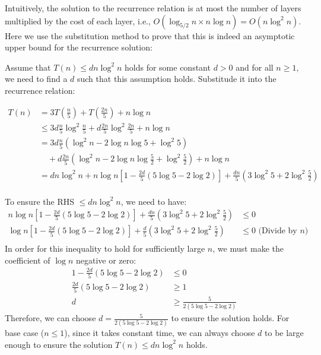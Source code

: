 \documentclass[11pt, a4paper, oneside]{memoir}
\begin{document}
Intuitively, the solution to the recurrence relation is at most the number of layers multiplied by the cost of each layer,
i.e., $O(\log_{5/2} n \times n \log n) = O(n \log^2 n)$. Here we use the substitution method to prove that this is indeed an asymptotic upper bound for the recurrence solution:

Assume that $T(n) \leq dn \log^2 n$ holds for some constant $d > 0$ and for all $n \geq 1$, we need to find a $d$ such that this assumption holds.
Substitude it into the recurrence relation:

\begin{align*}
    T(n) & = 3T(\frac{n}{5}) + T(\frac{2n}{5}) +  n \log n                                                              \\
         & \leq 3d\frac{n}{5} \log^2 \frac{n}{5} + d\frac{2n}{5} \log^2 \frac{2n}{5} + n \log n                         \\
         & =3d\frac{n}{5} (\log^2 n - 2 \log n \log 5 + \log^2 5)                                                       \\
         & \quad+d\frac{2n}{5} (\log^2 n - 2 \log n \log \frac{5}{2} + \log^2 \frac{5}{2}) + n \log n                   \\
         & = dn \log^2 n + n \log n [1-\frac{2d}{5}(5\log 5 - 2\log 2)] + \frac{dn}{5}(3\log^2 5 + 2\log^2 \frac{5}{2}) \\
\end{align*}

To ensure the RHS $\leq dn \log^2 n$, we need to have:
\begin{align*}
    n \log n [1-\frac{2d}{5}(5\log 5 - 2\log 2)] + \frac{dn}{5}(3\log^2 5 + 2\log^2 \frac{5}{2}) & \leq 0                         \\
    \log n [1-\frac{2d}{5}(5\log 5 - 2\log 2)] + \frac{d}{5}(3\log^2 5 + 2\log^2 \frac{5}{2})    & \leq 0 \text{ (Divide by $n$)} \\
\end{align*}
In order for this inequality to hold for sufficiently large $n$, we must make the coefficient of $\log n$ negative or zero:
\begin{align*}
    1-\frac{2d}{5}(5\log 5 - 2\log 2) & \leq 0                              \\
    \frac{2d}{5}(5\log 5 - 2\log 2)   & \geq 1                              \\
    d                                 & \geq \frac{5}{2(5\log 5 - 2\log 2)}
\end{align*}
Therefore, we can choose $d = \frac{5}{2(5\log 5 - 2\log 2)}$ to ensure the solution holds.
For base case ($n \leq 1$)\footnotemark, since it takes constant time, we can always choose $d$ to be large enough to ensure the solution $T(n) \leq dn \log^2 n$ holds.
\end{document}
